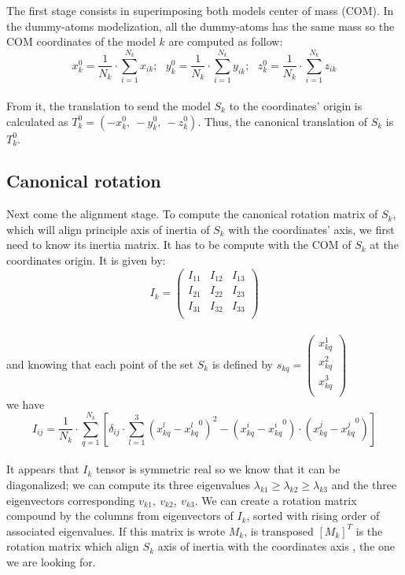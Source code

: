 \documentclass[a4paper, 11pt]{report}
\begin{document}
The first stage consists in superimposing both models center of mass 
(COM). 
In the dummy-atoms modelization, all the dummy-atoms has the same mass 
so the COM coordinates of the model $k$ are computed as follow:
\[
x_{k}^0 = \frac{1}{N_{k}} \cdot \sum\limits_{i=1}^{N_{k}} x_{ik};\ \ \ 
y_{k}^0 = \frac{1}{N_{k}} \cdot \sum\limits_{i=1}^{N_{k}} y_{ik};\ \ \ 
z_{k}^0 = \frac{1}{N_{k}} \cdot \sum\limits_{i=1}^{N_{k}} z_{ik}
\]\\
From it, the translation to send the model $S_{k}$ to the coordinates' 
origin is calculated as $T_{k}^0 = (-x_{k}^0,\ -y_{k}^0,\ -z_{k}^0)$. 
Thus, the canonical translation of $S_{k}$ is $T_{k}^0$.

\subsection{Canonical rotation}

Next come the alignment stage. 
To compute the canonical rotation matrix of $S_{k}$, which will align 
principle axis of inertia of $S_{k}$ with the coordinates' axis, we 
first need to know its inertia matrix. 
It has to be compute with the COM of $S_{k}$ at the coordinates origin. 
It is given by:
\[
I_{k}=
\begin{pmatrix}
 I_{11} & I_{12} & I_{13} \\
 I_{21} & I_{22} & I_{23} \\
 I_{31} & I_{32} & I_{33} \\
\end{pmatrix}
\]\\
and knowing that each point of the set $S_{k}$ is defined by
$
s_{kq}=
\begin{pmatrix}
 x_{kq}^1 \\
 x_{kq}^2 \\
 x_{kq}^3 \\
\end{pmatrix}
$\\
we have
\[
I_{ij} = \frac{1}{N_{k}} \cdot \sum\limits_{q=1}^{N_{k}} 
[\delta_{ij} \cdot \sum\limits_{l=1}^3 
 (x_{kq}^l - {x_{kq}^l}^0)^2 -  (x_{kq}^i - {x_{kq}^i}^0) 
 \cdot (x_{kq}^j - {x_{kq}^j}^0)]
\]\\
It appears that $I_{k}$ tensor is symmetric real so we know that it 
can be diagonalized; we can compute its three eigenvalues 
$\lambda_{k1} \geq \lambda_{k2} \geq \lambda_{k3}$ and the three 
eigenvectors corresponding $v_{k1},\ v_{k2},\ v_{k3}$. 
We can create a rotation matrix compound by the columns from 
eigenvectors of $I_{k}$, sorted with rising order of associated 
eigenvalues. 
If this matrix is wrote $M_{k}$, is transposed $[M_{k}]^T$ is the 
rotation matrix which align $S_{k}$ axis of inertia with the 
coordinates axis \cite{supcomb}, the one we are looking for.
\end{document}
